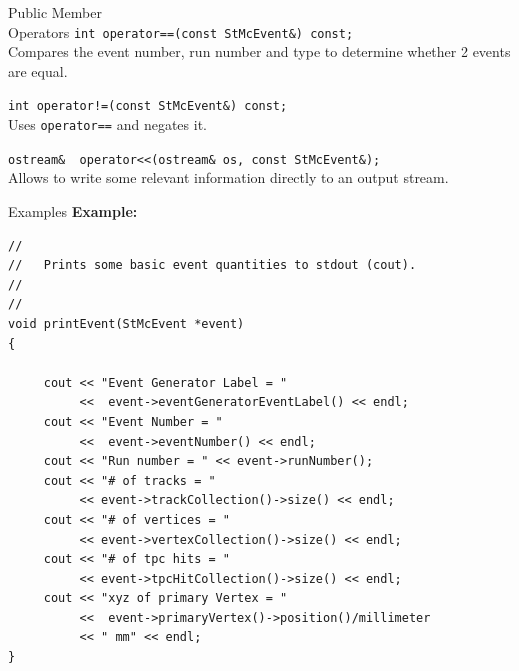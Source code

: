 \begin{Entry}
\item[Public Member\\ Operators]
    \verb+int operator==(const StMcEvent&) const;+\\
    Compares the event number, run number and type to determine
    whether 2 events are equal.

    \verb+int operator!=(const StMcEvent&) const;+\\
    Uses {\tt operator==} and negates it.

    \verb+ostream&  operator<<(ostream& os, const StMcEvent&);+\\
    Allows to write some relevant information directly to an output
    stream.

\item[Examples]
{\bf Example:}
{\footnotesize
\begin{verbatim}
//
//   Prints some basic event quantities to stdout (cout).
//   
//
void printEvent(StMcEvent *event)
{
     
     cout << "Event Generator Label = "
          <<  event->eventGeneratorEventLabel() << endl;
     cout << "Event Number = "
          <<  event->eventNumber() << endl;
     cout << "Run number = " << event->runNumber();
     cout << "# of tracks = "
          << event->trackCollection()->size() << endl;
     cout << "# of vertices = "
          << event->vertexCollection()->size() << endl;
     cout << "# of tpc hits = "
          << event->tpcHitCollection()->size() << endl;
     cout << "xyz of primary Vertex = "
          <<  event->primaryVertex()->position()/millimeter
          << " mm" << endl;
}

\end{verbatim}
}%


\end{Entry}
\clearpage

%
%
